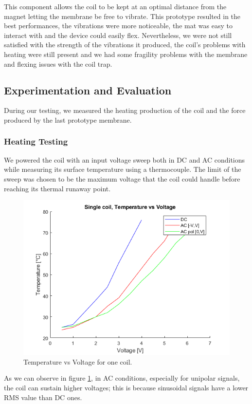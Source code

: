 This component allows the coil to be kept at an optimal distance from the magnet letting the membrane be free to vibrate.
This prototype resulted in the best performances, the vibrations were more noticeable, the mat was easy to interact with and the device could easily flex.
Nevertheless, we were not still satisfied with the strength of the vibrations it produced, the coil's problems with heating were still present and we had some fragility problems with the membrane and flexing issues with the coil trap. 

\subsection{Experimentation and Evaluation}
During our testing, we measured the heating production of the coil and the force produced by the last prototype membrane.
\subsubsection{Heating Testing}
We powered the coil with an input voltage sweep both in DC and AC conditions while measuring its surface temperature using a thermocouple. The limit of the sweep was chosen to be the maximum voltage that the coil could handle before reaching its thermal runaway point.
\begin{figure}[H]
    \centering
    \includegraphics[width = 0.5\linewidth]{Figures/Temp_vs_Volt_1_coil.png}
    \caption{Temperature vs Voltage for one coil.}
    \label{fig: Single_coil_heating_tests}
\end{figure}
As we can observe in figure \ref{fig: Single_coil_heating_tests}, in AC conditions, especially for unipolar signals, the coil can sustain higher voltages; this is because sinusoidal signals have a lower RMS value than DC ones.

